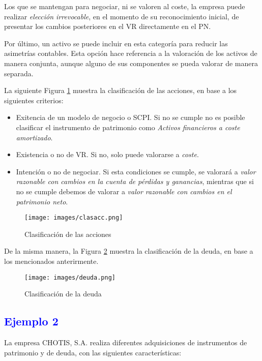 Los que se mantengan para negociar, ni se valoren al coste, la empresa puede realizar \textit{elección irrevocable}, en el momento de su reconocimiento inicial, de presentar los cambios posteriores en el VR directamente en el PN.

Por último, un activo se puede incluir en esta categoría para reducir las asimetrías contables. Esta opción hace referencia a la valoración de los activos de manera conjunta, aunque alguno de sus componentes se pueda valorar de manera separada.

La siguiente Figura \ref{fig:Acciones} muestra la clasificación de las acciones, en base a los siguientes criterios:

\begin{itemize}
    \item Exitencia de un modelo de negocio o SCPI. Si no se cumple no es posible clasificar el instrumento de patrimonio como \textit{Activos financieros a coste amortizado}.
    \item Existencia o no de VR. Si no, solo puede valorarse a \textit{coste}.  
    \item Intención o no de negociar. Si esta condiciones se cumple, se valorará a \textit{valor razonable con cambios en la cuenta de pérdidas y ganancias}, mientras que si no se cumple debemos de valorar a \textit{valor razonable con cambios en el patrimonio neto}.
\end{itemize}

\begin{figure}[H]
    \centering
    \texttt{[image: images/clasacc.png]}
    \caption{Clasificación de las acciones}
    \label{fig:Acciones}
\end{figure}

De la misma manera, la Figura \ref{fig:Deuda} muestra la clasificación de la deuda, en base a los mencionados anterirmente.

\begin{figure}[H]
    \centering
    \texttt{[image: images/deuda.png]}
    \caption{Clasificación de la deuda}
    \label{fig:Deuda}
\end{figure}

\subsection*{\textcolor{blue}{Ejemplo 2}}

La empresa CHOTIS, S.A. realiza diferentes adquisiciones de instrumentos de patrimonio y de deuda, con las siguientes características:

